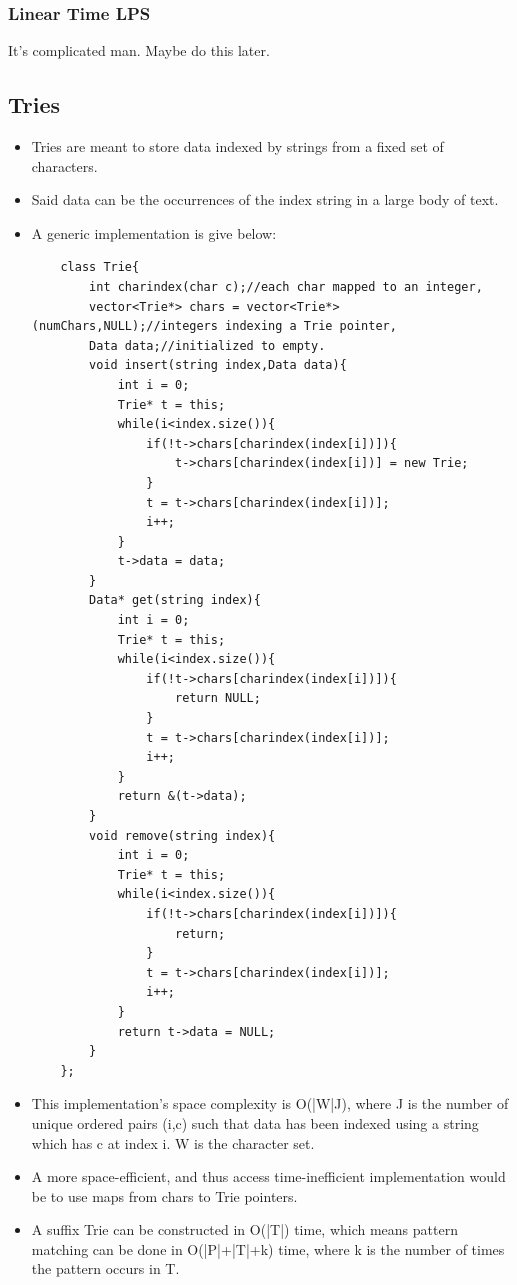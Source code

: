 \documentclass{report}
\begin{document}
\subsubsection{Linear Time LPS}
It's complicated man. Maybe do this later.
\subsection{Tries}
\begin{itemize}
    \item Tries are meant to store data indexed by strings from a fixed set of characters.
    \item Said data can be the occurrences of the index string in a large body of text.
    \item A generic implementation is give below:
    \begin{lstlisting}
    class Trie{
        int charindex(char c);//each char mapped to an integer,
        vector<Trie*> chars = vector<Trie*>(numChars,NULL);//integers indexing a Trie pointer,
        Data data;//initialized to empty.
        void insert(string index,Data data){
            int i = 0;
            Trie* t = this;
            while(i<index.size()){
                if(!t->chars[charindex(index[i])]){
                    t->chars[charindex(index[i])] = new Trie;
                }
                t = t->chars[charindex(index[i])];
                i++;
            }
            t->data = data;
        }
        Data* get(string index){
            int i = 0;
            Trie* t = this;
            while(i<index.size()){
                if(!t->chars[charindex(index[i])]){
                    return NULL;
                }
                t = t->chars[charindex(index[i])];
                i++;
            }
            return &(t->data);
        }
        void remove(string index){
            int i = 0;
            Trie* t = this;
            while(i<index.size()){
                if(!t->chars[charindex(index[i])]){
                    return;
                }
                t = t->chars[charindex(index[i])];
                i++;
            }
            return t->data = NULL;
        }
    };
    \end{lstlisting}
    \item This implementation's space complexity is O(|W|J), where J is the number of unique
    ordered pairs (i,c) such that data has been indexed using a string which has c at index i.
    W is the character set.
    \item A more space-efficient, and thus access time-inefficient implementation would be
    to use maps from chars to Trie pointers.
    \item A suffix Trie can be constructed in O(|T|) time, which means pattern matching can be done
    in O(|P|+|T|+k) time, where k is the number of times the pattern occurs in T.  
    \end{itemize}
\end{document}
